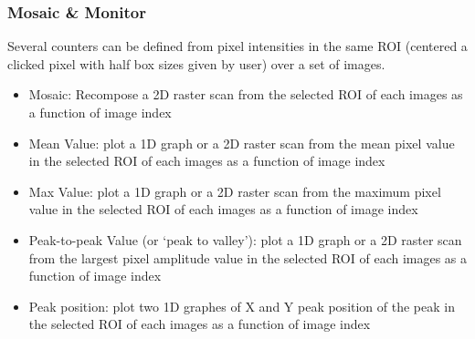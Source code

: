 \documentclass[letterpaper,10pt,english]{sphinxmanual}
\begin{document}
\subsubsection{Mosaic \& Monitor}
\label{\detokenize{PeakSearchGUI:mosaic-monitor}}
Several counters can be defined from pixel intensities in the same ROI (centered a clicked pixel with half box sizes given by user) over a set of images.
\begin{itemize}
\item {} 
Mosaic: Recompose a 2D raster scan from the selected ROI of each images as a function of image index

\item {} 
Mean Value: plot a 1D graph or a 2D raster scan from the mean pixel value in the selected ROI of each images as a function of image index

\item {} 
Max Value: plot a 1D graph or a 2D raster scan from the maximum pixel value in the selected ROI of each images as a function of image index

\item {} 
Peak-to-peak Value (or ‘peak to valley’): plot a 1D graph or a 2D raster scan from the largest pixel amplitude value in the selected ROI of each images as a function of image index

\item {} 
Peak position: plot two 1D graphes of X and Y peak position of the peak in the selected ROI of each images as a function of image index

\end{itemize}
\end{document}
